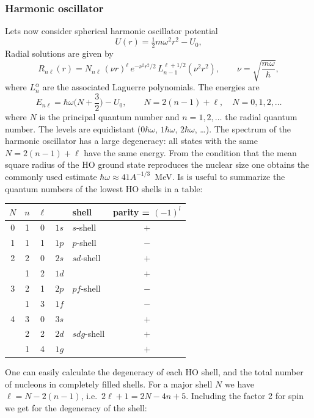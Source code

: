 \documentclass[11pt,a4paper]{article}
\begin{document}
\subsubsection*{Harmonic oscillator}
Lets now consider spherical harmonic oscillator potential
\[
U(r)=\tfrac12 m\omega^2r^2-U_0 ,
\]
Radial solutions are given by
\[
R_{n\ell}(r)=N_{n\ell}\,(\nu r)^\ell\,e^{-\nu^2r^2/2}\,L_{n-1}^{\ell+1/2}(\nu^2r^2),
\qquad \nu=\sqrt{\frac{m\omega}{\hbar}},
\]
where $L_{n}^{\alpha}$ are the associated Laguerre polynomials. The energies are
\[
E_{n\ell}=\hbar\omega\Big(N+\frac32\Big)-U_0,
\qquad N=2(n-1)+\ell,\quad N=0,1,2,\dots
\]
where $N$ is the principal quantum number and $n=1,2,\dots$ the radial quantum number. The levels are equidistant ($0\hbar\omega$, $1\hbar\omega$, $2\hbar\omega$, \dots).
The spectrum of the harmonic oscillator has a large degeneracy: all states with the same $N=2(n-1)+\ell$ have the same energy. From the condition that the mean square radius of the HO ground state reproduces the nuclear size one obtains the commonly used estimate $\hbar\omega\approx41A^{-1/3}$~MeV.
Is is useful to summarize the quantum numbers of the lowest HO shells in a table:
\begin{center}
\begin{tabular}{c c c c l c}
$N$ & $n$ & $\ell$ & & shell & parity = $(-1)^l$ \\ \hline
0 & 1 & 0 & $1s$ & $s$-shell & $+$ \\ \hline
1 & 1 & 1 & $1p$ & $p$-shell & $-$ \\ \hline
2 & 2 & 0 & $2s$ & $sd$-shell & $+$ \\
  & 1 & 2 & $1d$ &  & $+$ \\ \hline
3 & 2 & 1 & $2p$ & $pf$-shell & $-$ \\
  & 1 & 3 & $1f$ &  & $-$ \\ \hline
4 & 3 & 0 & $3s$ & & $+$ \\
  & 2 & 2 & $2d$ & $sdg$-shell & $+$ \\
  & 1 & 4 & $1g$ & & $+$ \\ \hline
\end{tabular}
\end{center}

One can easily calculate the degeneracy of each HO shell, and the total number of nucleons in completely filled shells. For a major shell $N$ we have $\ell=N-2(n-1)$, i.e.\ $2\ell+1=2N-4n+5$. Including the factor 2 for spin we get for the degeneracy of the shell:
\end{document}
